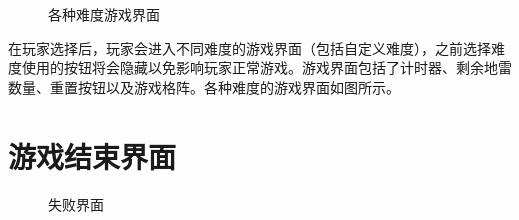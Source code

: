 \documentclass{article}
\begin{document}
\begin{CJK}{UTF8}{gbsn}
\begin{figure}[h]
    \centering
    \hspace{0.2cm}
    \hspace{0.2cm}
    \caption{各种难度游戏界面}
    \label{fig:example2}
\end{figure}

在玩家选择后，玩家会进入不同难度的游戏界面（包括自定义难度），之前选择难度使用的按钮将会隐藏以免影响玩家正常游戏。游戏界面包括了计时器、剩余地雷数量、重置按钮以及游戏格阵。各种难度的游戏界面如图所示。

\section{游戏结束界面}

\begin{figure}[h]
    \centering
    \hspace{0.2cm}
    \caption{失败界面}
    \label{fig:example3}
\end{figure}


\end{CJK}
\end{document}
